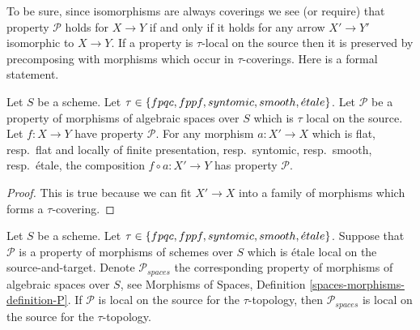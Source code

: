\noindent
To be sure, since isomorphisms are always coverings
we see (or require) that property $\mathcal{P}$ holds for $X \to Y$
if and only if it holds for any arrow $X' \to Y'$ isomorphic to $X \to Y$.
If a property is $\tau$-local on the source then it is preserved by
precomposing with morphisms which occur in $\tau$-coverings. Here
is a formal statement.

\begin{lemma}
\label{lemma-precompose-property-local-source}
Let $S$ be a scheme.
Let $\tau \in \{fpqc,\linebreak[0] fppf,\linebreak[0] syntomic,\linebreak[0]
smooth,\linebreak[0] \acute{e}tale\}$.
Let $\mathcal{P}$ be a property of morphisms of algebraic spaces over $S$
which is $\tau$ local on the source. Let $f : X \to Y$ have property
$\mathcal{P}$. For any morphism $a : X' \to X$ which is
flat, resp.\ flat and locally of finite presentation, resp.\ syntomic,
resp.\ smooth, resp.\ \'etale, the composition $f \circ a : X' \to Y$ has
property $\mathcal{P}$.
\end{lemma}

\begin{proof}
This is true because we can fit $X' \to X$ into a family of
morphisms which forms a $\tau$-covering.
\end{proof}

\begin{lemma}
\label{lemma-transfer-from-schemes}
Let $S$ be a scheme.
Let $\tau \in \{fpqc,\linebreak[0] fppf,\linebreak[0] syntomic,\linebreak[0]
smooth,\linebreak[0] \acute{e}tale\}$.
Suppose that $\mathcal{P}$ is a property of morphisms of schemes over $S$
which is \'etale local on the source-and-target. Denote $\mathcal{P}_{spaces}$
the corresponding property of morphisms of algebraic spaces over $S$, see
Morphisms of Spaces, Definition \ref{spaces-morphisms-definition-P}.
If $\mathcal{P}$ is local on the source for the $\tau$-topology, then
$\mathcal{P}_{spaces}$ is local on the source for the $\tau$-topology.
\end{lemma}

